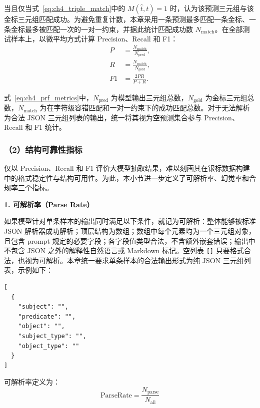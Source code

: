   当且仅当式~\eqref{eq:ch4_triple_match}中的 $M(\hat{t},t)=1$ 时，认为该预测三元组与该金标三元组匹配成功。为避免重复计数，本章采用一条预测最多匹配一条金标、一条金标最多被匹配一次的一对一约束，并据此统计匹配成功数 $N_{\mathrm{match}}$。在全部测试样本上，以微平均方式计算 Precision、Recall 和 F1：
  \begin{equation}
  \begin{aligned}
  P&=\frac{N_{\mathrm{match}}}{N_{\mathrm{pred}}},\\
  R&=\frac{N_{\mathrm{match}}}{N_{\mathrm{gold}}},\\
  F1&=\frac{2PR}{P+R}.
  \end{aligned}
  \label{eq:ch4_prf_metrics}
  \end{equation}

  式~\eqref{eq:ch4_prf_metrics}中，$N_{\mathrm{pred}}$ 为模型输出三元组总数，$N_{\mathrm{gold}}$ 为金标三元组总数，$N_{\mathrm{match}}$ 为在字符级容错匹配和一对一约束下的成功匹配总数。对于无法解析为合法 JSON 三元组列表的输出，统一将其视为空预测集合参与 Precision、Recall 和 F1 统计。

\subsubsection*{（2）结构可靠性指标}

  仅以 Precision、Recall 和 F1 评价大模型抽取结果，难以刻画其在银标数据构建中的格式稳定性与结构可用性。为此，本小节进一步定义了可解析率、幻觉率和合规率三个指标。

  \textbf{1. 可解析率（Parse Rate）} 
  
  如果模型针对单条样本的输出同时满足以下条件，就记为可解析：整体能够被标准 JSON 解析器成功解析；顶层结构为数组；数组中每个元素均为一个三元组对象，且包含 prompt 规定的必要字段；各字段值类型合法，不含额外嵌套错误；输出中不包含 JSON 之外的解释性自然语言或 Markdown 标记。空列表 \texttt{[]} 只要格式合法，也视为可解析。本章统一要求单条样本的合法输出形式为纯 JSON 三元组列表，示例如下：

\begin{lstlisting}[style=promptbox]
[
  {
    "subject": "",
    "predicate": "",
    "object": "",
    "subject_type": "",
    "object_type": ""
  }
]
\end{lstlisting}

  可解析率定义为：
  \begin{equation}
  \mathrm{ParseRate}=\frac{N_{\mathrm{parse}}}{N_{\mathrm{all}}}
  \label{eq:ch4_parse_rate}
  \end{equation}

